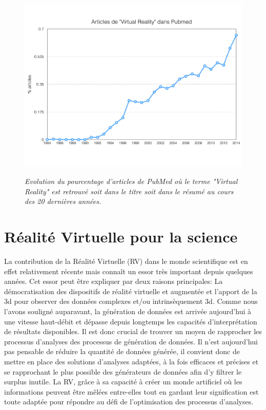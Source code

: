 \begin{figure}
  \centering
  {\includegraphics[width=.75\linewidth]{./figures/ch2/VR_pubmed_trend}}
    \caption{{\it Evolution du pourcentage d'articles de PubMed où le terme "Virtual Reality" est retrouvé soit dans le titre soit dans le résumé au cours des 20 dernières années.}}
  \label{Fig:VR_pubmed_trend}
  \hspace{0.3cm}
\end{figure}

\section{Réalité Virtuelle pour la science} \label{RV_science}

La contribution de la Réalité Virtuelle (RV) dans le monde scientifique est en effet relativement récente mais connaît un essor très important depuis quelques années. Cet essor peut être expliquer par deux raisons principales: La démocratisation des dispositifs de réalité virtuelle et augmentée et l'apport de la 3d pour observer des données complexes et/ou intrinsèquement 3d. Comme nous l'avons souligné auparavant, la génération de données est arrivée aujourd'hui à une vitesse haut-débit et dépasse depuis longtemps les capacités d'interprétation de résultats disponibles. Il est donc crucial de trouver un moyen de rapprocher les processus d'analyses des processus de génération de données. Il n'est aujourd'hui pas pensable de réduire la quantité de données générée, il convient donc de mettre en place des solutions d'analyses adaptées, à la fois efficaces et précises et se rapprochant le plus possible des générateurs de données afin d'y filtrer le surplus inutile. La RV, grâce à sa capacité à créer un monde artificiel où les informations peuvent être mêlées entre-elles tout en gardant leur signification est toute adaptée pour répondre au défi de l'optimisation des processus d'analyses.

